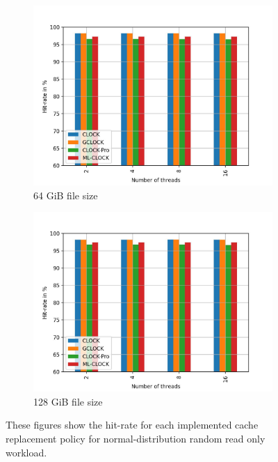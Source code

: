 \documentclass[
	12pt,
	a4paper,
	abstract,
	bibliography=totoc,
	chapterprefix,
	headings=openright,
	numbers=endperiod,
	parskip=half,
	twoside,
]{scrreprt}
\begin{document}
\begin{figure}[H]
\begin{subfigure}{0.4\textwidth}
	\end{subfigure}
	\hfill
	\begin{subfigure}{0.4\textwidth}
		\includegraphics[width=\textwidth]{multi_64_gb_randread_normal.jpg}		
		\caption{64 GiB file size}
		\label{fig:rw_90to10  zoned}
	\end{subfigure}
	\hfill
	\begin{subfigure}{0.4\textwidth}
		\includegraphics[width=\textwidth]{multi_128_gb_randread_normal.jpg}		
		\caption{128 GiB file size}
		\label{fig:rw_90to10  uniform}
	\end{subfigure}
	\caption{These figures show the hit-rate for each implemented cache replacement policy for normal-distribution random read only workload.}
\end{figure}
\end{document}
